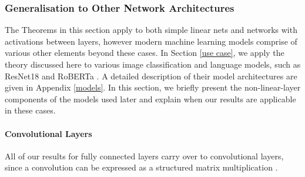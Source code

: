 \documentclass{article}
\theoremstyle{plain}
\theoremstyle{definition}
\theoremstyle{remark}
\begin{document}



\subsubsection{Generalisation to Other Network Architectures}\label{gen}
 The Theorems in this section apply to both simple linear nets and networks with activations between layers, however modern machine learning models comprise of various other elements beyond these cases. In Section \ref{use case}, we apply the theory discussed here  to various image classification and language models, such as ResNet18 \cite{he_deep_2016} and RoBERTa \cite{liu_roberta_2019}. A detailed description of their model architectures are given in Appendix \ref{models}. In this section, we briefly present the non-linear-layer components of the models used later and explain when our results are applicable in these cases.

\paragraph{Convolutional Layers}
All of our results for fully connected layers carry over to convolutional layers, since a convolution can be expressed as a structured matrix multiplication \cite{dumoulin_guide_2018,chellapilla_high_2006}.
\end{document}
